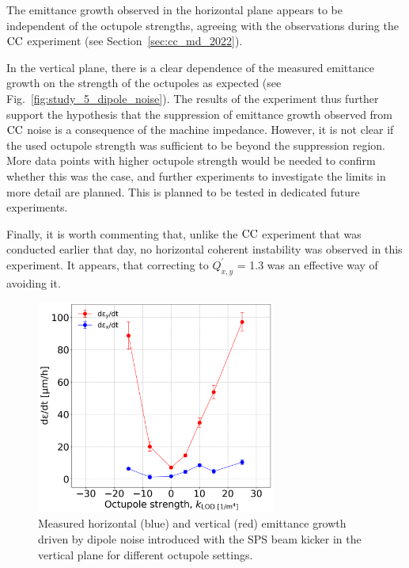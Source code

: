 The emittance growth observed in the horizontal plane appears to be independent of the octupole strengths, agreeing with the observations during the ${\mathrm{CC}}$ experiment (see Section~\ref{sec:cc_md_2022}). 

In the vertical plane, there is a clear dependence of the measured emittance growth on the strength of the octupoles as expected (see Fig.~\ref{fig:study_5_dipole_noise}). The results of the experiment thus further support the hypothesis that the suppression of emittance growth observed from ${\mathrm{CC}}$ noise is a consequence of the machine impedance. However, it is not clear if the used octupole strength was sufficient to be beyond the suppression region. More data points with higher octupole strength would be needed to confirm whether this was the case, and further experiments to investigate the limits in more detail are planned. This is planned to be tested in dedicated future experiments.

Finally, it is worth commenting that, unlike the ${\mathrm{CC}}$ experiment that was conducted earlier that day, no horizontal coherent instability was observed in this experiment. It appears, that correcting to $Q^\prime_{x,y}$ = 1.3 was an effective way of avoiding it.
  

\begin{figure}[!h]
   \centering         
   \includegraphics[width=0.7\textwidth]{images/Ch8/emitGrowth_H_V_dipole_noise_damper_md_measurements.png}
       \caption{Measured horizontal (blue) and vertical (red) emittance growth driven by dipole noise introduced with the SPS beam kicker in the vertical plane for different octupole settings.}
       \label{fig:coast_dipole_noise_damper_md_2022_measurement}
\end{figure}

